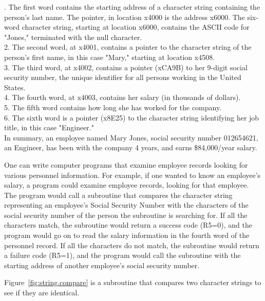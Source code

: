 \documentclass{patt}
\begin{document}
. The first word contains the starting address of a character 
string containing the person's last name.  The pointer, in location x4000 is the
address x6000.  The six-word character string, starting at location x6000,
contains the ASCII code for "Jones," terminated with the null character.\\
2. The second word, at x4001, contains a pointer to the character string
of the person's first name, in this case "Mary," starting at location x4508.\\
3. The third word, at x4002, contains a pointer (xCA9B) to her 9-digit 
social security number, the unique identifier for all persons working in the
United States.\\
4. The fourth word, at x4003, contains her salary (in thousands of dollars).\\
5. The fifth word contains how long she has worked for the company.\\
6. The sixth word is a pointer (x8E25) to the character string identifying 
her job title, in this case "Engineer."\\

In summary, an employee named Mary Jones, social security number 012654621, 
an Engineer, has been with the company 4 years, and earns \$84,000/year salary. 

One can write computer programs that examine employee records looking for 
various personnel information.  For example, if one wanted to know an 
employee's salary, a program could examine employee records, looking for 
that employee.  The program would call a subroutine that compares the 
character string representing an employee's Social Security Number with the 
characters of the social security number of the person  
the subroutine is searching for.  If all the characters match, the 
subroutine would return a success code (R5=0), and the program would go on to
read the salary information in the fourth word of the personnel record.  If all
the characters do not match, the subroutine would return a failure code (R5=1), 
and the program would call the subroutine with the starting address of another 
employee's social security number. 

Figure~\ref{fig:string.compare} is a subroutine that compares two character 
strings to see if they are identical.  
\end{document}
